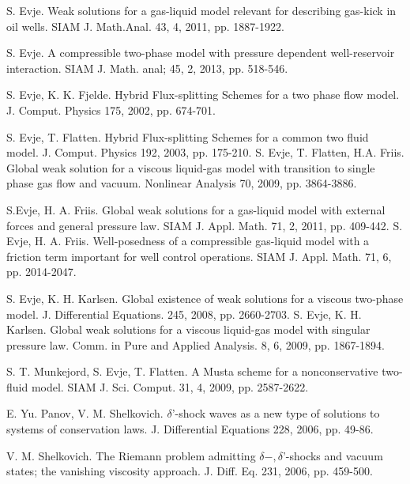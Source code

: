\documentclass[a4paper,12pt]{article}
\begin{document}
\begin{thebibliography}{< >}
 S. Evje. Weak solutions for a gas-liquid model relevant for describing gas-kick in oil wells. SIAM J. Math.Anal. 43, 4, 2011, pp. 1887-1922.

 S. Evje. A compressible two-phase model with pressure dependent well-reservoir interaction. SIAM J. Math. anal; 45, 2, 2013, pp. 518-546.


 S. Evje, K. K. Fjelde. Hybrid Flux-splitting Schemes for a two phase flow model. J. Comput. Physics 175, 2002, pp. 674-701.



 S. Evje, T. Flatten. Hybrid Flux-splitting Schemes for a common two fluid model. J. Comput. Physics 192, 2003, pp. 175-210.
 S. Evje, T. Flatten, H.A. Friis. Global weak solution for a viscous liquid-gas model with transition to single phase gas flow and vacuum. Nonlinear Analysis 70, 2009, pp. 3864-3886.

 S.Evje, H. A. Friis. Global weak solutions for a gas-liquid model with external forces and general pressure law. SIAM J. Appl. Math. 71, 2, 2011, pp. 409-442.
 S. Evje, H. A. Friis. Well-posedness of a compressible gas-liquid model with a friction term important for well control operations. SIAM J. Appl. Math. 71, 6, pp. 2014-2047.


 S. Evje, K. H. Karlsen. Global existence of weak solutions for a viscous two-phase model. J. Differential Equations. 245, 2008, pp. 2660-2703.
 S. Evje, K. H. Karlsen. Global weak solutions for a viscous liquid-gas model with singular pressure law. Comm. in Pure and Applied Analysis. 8, 6, 2009, pp. 1867-1894.





 S. T. Munkejord, S. Evje, T. Flatten. A Musta scheme for a nonconservative two-fluid model. SIAM J. Sci. Comput. 31, 4, 2009, pp. 2587-2622.


 E. Yu. Panov, V. M. Shelkovich. $\delta$'-shock waves as a new type of solutions to systems of conservation laws. J. Differential Equations 228, 2006, pp. 49-86.


 V. M. Shelkovich. The Riemann problem admitting $\delta-,\delta$'-shocks and vacuum states; the vanishing viscosity approach. J. Diff. Eq. 231, 2006, pp. 459-500.





\end{thebibliography}
\end{document}
